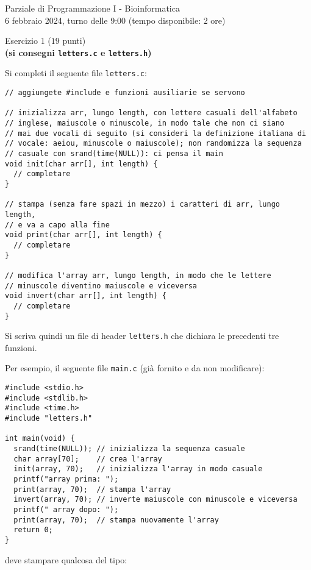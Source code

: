 \documentclass[12pt]{article}
\begin{document}
\begin{center}{\LARGE Parziale di Programmazione I - Bioinformatica}\\
  \large 6 febbraio 2024, turno delle 9:00 (tempo disponibile: 2 ore)
\end{center}

\vspace*{1ex}
\begin{center}{\Large Esercizio 1} ($19$ punti)\\
  \textbf{(si consegni \texttt{letters.c} e \texttt{letters.h})}
\end{center}

Si completi il seguente file \texttt{letters.c}:

\begin{center}
\begin{lstlisting}[language=myC]
// aggiungete #include e funzioni ausiliarie se servono

// inizializza arr, lungo length, con lettere casuali dell'alfabeto
// inglese, maiuscole o minuscole, in modo tale che non ci siano
// mai due vocali di seguito (si consideri la definizione italiana di
// vocale: aeiou, minuscole o maiuscole); non randomizza la sequenza
// casuale con srand(time(NULL)): ci pensa il main
void init(char arr[], int length) {
  // completare
}

// stampa (senza fare spazi in mezzo) i caratteri di arr, lungo length,
// e va a capo alla fine
void print(char arr[], int length) {
  // completare
}

// modifica l'array arr, lungo length, in modo che le lettere
// minuscole diventino maiuscole e viceversa
void invert(char arr[], int length) {
  // completare
}
\end{lstlisting}
\end{center}
%
Si scriva quindi un file di header \texttt{letters.h} che dichiara le precedenti tre funzioni.

Per esempio, il seguente file \texttt{main.c}
(gi\`a fornito e da non modificare):

\begin{center}
  \begin{lstlisting}[language=myC]
#include <stdio.h>
#include <stdlib.h>
#include <time.h>
#include "letters.h"

int main(void) {
  srand(time(NULL)); // inizializza la sequenza casuale
  char array[70];    // crea l'array
  init(array, 70);   // inizializza l'array in modo casuale
  printf("array prima: ");
  print(array, 70);  // stampa l'array
  invert(array, 70); // inverte maiuscole con minuscole e viceversa
  printf(" array dopo: ");
  print(array, 70);  // stampa nuovamente l'array
  return 0;
}
  \end{lstlisting}
\end{center}
deve stampare qualcosa del tipo:
\end{document}
